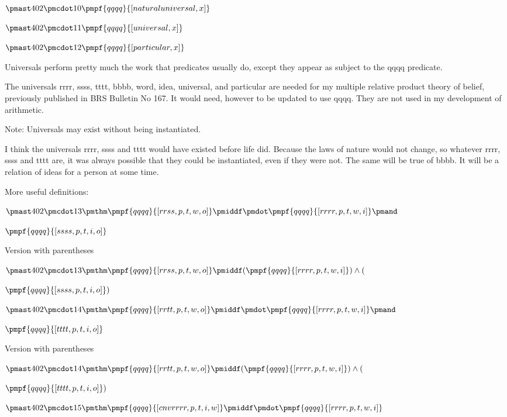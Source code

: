 \documentclass[12pt]{article}
\begin{document}
$\pmast 402 \pmcdot 10 \pmpf{qqqq}{[naturaluniversal, x]}$

$\pmast 402 \pmcdot 11 \pmpf{qqqq}{[universal, x]}$

$\pmast 402 \pmcdot 12 \pmpf{qqqq}{[particular, x]}$

Universals perform pretty much the work that predicates usually do, except they appear as subject to the qqqq predicate.

The universals rrrr, ssss, tttt, bbbb, word, idea, universal, and particular are needed for my multiple relative product theory of belief, previously published in BRS Bulletin No 167. It would need, however to be updated to use qqqq.
They are not used in my development of arithmetic.

Note: Universals may exist without being instantiated.

I think the universals rrrr, ssss and tttt would have existed before life did. Because the laws of nature would not change, so whatever rrrr, ssss and tttt are, it was always possible that they could be instantiated, even if they were not. The same will be true of bbbb. It will be a relation of ideas for a person at some time.

More useful definitions:

$\pmast 402 \pmcdot 13 \pmthm \pmpf{qqqq}{[rrss, p, t, w, o]} \pmiddf \pmdot \pmpf{qqqq}{[rrrr, p, t, w, i]} \pmand $

$\pmpf{qqqq}{[ssss, p, t, i, o]} $
 
 

Version with parentheses

$\pmast 402 \pmcdot 13 \pmthm \pmpf{qqqq}{[rrss, p, t, w, o]} \pmiddf  (  \pmpf{qqqq}{[rrrr, p, t, w, i]} ) \land ( $

$\pmpf{qqqq}{[ssss, p, t, i, o]} )$


$\pmast 402 \pmcdot 14 \pmthm \pmpf{qqqq}{[rrtt, p, t, w, o]} \pmiddf \pmdot \pmpf{qqqq}{[rrrr, p, t, w, i]} \pmand $

$\pmpf{qqqq}{[tttt, p, t, i, o]} $
 
 

Version with parentheses

$\pmast 402 \pmcdot 14 \pmthm \pmpf{qqqq}{[rrtt, p, t, w, o]} \pmiddf  (  \pmpf{qqqq}{[rrrr, p, t, w, i]} ) \land ( $

$\pmpf{qqqq}{[tttt, p, t, i, o]} )$


$\pmast 402 \pmcdot 15 \pmthm \pmpf{qqqq}{[cnvrrrr, p, t, i, w]} \pmiddf \pmdot \pmpf{qqqq}{[rrrr, p, t, w, i]} $
 
\end{document}
